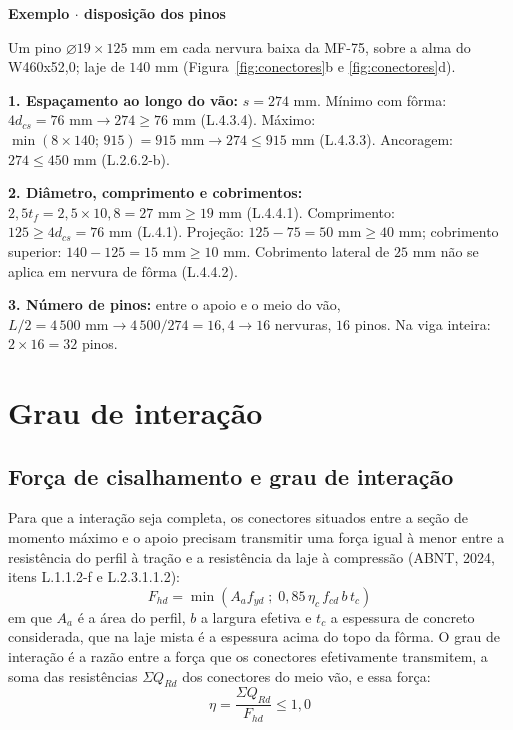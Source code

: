 \documentclass[11pt,a4paper]{article}
\newcommand{\caixaexemplo}[2]{%
  \par\vspace{6pt}\noindent\colorbox{examplebg}{%
    \parbox{\dimexpr\linewidth-2\fboxsep\relax}{%
      \vspace{4pt}\textbf{\color{exampleaccent}#1}\par\vspace{3pt}#2\vspace{4pt}%
    }%
  }\par\vspace{6pt}%
}
\begin{document}
\caixaexemplo{Exemplo $\cdot$ disposição dos pinos}{%
Um pino $\varnothing 19 \times 125\text{ mm}$ em cada nervura baixa da MF-75, sobre a alma do W460x52,0; laje de $140\text{ mm}$ (Figura~\ref{fig:conectores}b e \ref{fig:conectores}d).\par\vspace{3pt}
\textbf{1. Espaçamento ao longo do vão:} $s = 274\text{ mm}$. Mínimo com fôrma: $4 d_{cs} = 76\text{ mm} \rightarrow 274 \ge 76\text{ mm}$ (L.4.3.4). Máximo: $\min(8 \times 140;\, 915) = 915\text{ mm} \rightarrow 274 \le 915\text{ mm}$ (L.4.3.3). Ancoragem: $274 \le 450\text{ mm}$ (L.2.6.2-b).\par
\textbf{2. Diâmetro, comprimento e cobrimentos:} $2{,}5 t_f = 2{,}5 \times 10{,}8 = 27\text{ mm} \ge 19\text{ mm}$ (L.4.4.1). Comprimento: $125 \ge 4 d_{cs} = 76\text{ mm}$ (L.4.1). Projeção: $125 - 75 = 50\text{ mm} \ge 40\text{ mm}$; cobrimento superior: $140 - 125 = 15\text{ mm} \ge 10\text{ mm}$. Cobrimento lateral de $25\text{ mm}$ não se aplica em nervura de fôrma (L.4.4.2).\par
\textbf{3. Número de pinos:} entre o apoio e o meio do vão, $L/2 = 4\,500\text{ mm} \rightarrow 4\,500/274 = 16{,}4 \rightarrow 16$ nervuras, $16$ pinos. Na viga inteira: $2 \times 16 = 32$ pinos.}

\section{Grau de interação}

\subsection{Força de cisalhamento e grau de interação}

Para que a interação seja completa, os conectores situados entre a seção de momento máximo e o apoio precisam transmitir uma força igual à menor entre a resistência do perfil à tração e a resistência da laje à compressão (ABNT, 2024, itens L.1.1.2-f e L.2.3.1.1.2):
\begin{equation}
  F_{hd} = \min\left(A_a f_{yd} \; ; \; 0{,}85\,\eta_c\,f_{cd}\,b\,t_c\right)
  \label{eq:fhd}
\end{equation}
em que $A_a$ é a área do perfil, $b$ a largura efetiva e $t_c$ a espessura de concreto considerada, que na laje mista é a espessura acima do topo da fôrma. O grau de interação é a razão entre a força que os conectores efetivamente transmitem, a soma das resistências $\Sigma Q_{Rd}$ dos conectores do meio vão, e essa força:
\begin{equation}
  \eta = \frac{\Sigma Q_{Rd}}{F_{hd}} \le 1{,}0
  \label{eq:eta}
\end{equation}
\end{document}
